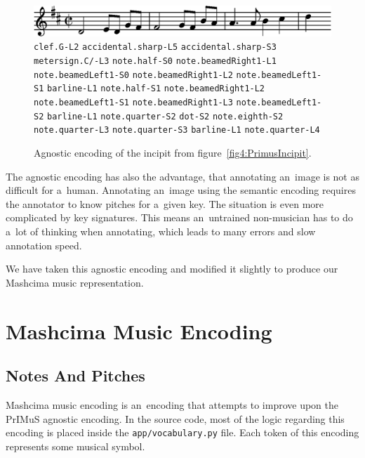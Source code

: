 \begin{figure}[h]
    \centering
    \includegraphics[width=140mm]{../img/primus-incipit}
    \verb`clef.G-L2`
    \quad\verb`accidental.sharp-L5`
    \quad\verb`accidental.sharp-S3`
    \quad\verb`metersign.C/-L3`
    \quad\verb`note.half-S0`
    \quad\verb`note.beamedRight1-L1`
    \quad\verb`note.beamedLeft1-S0`
    \quad\verb`note.beamedRight1-L2`
    \quad\verb`note.beamedLeft1-S1`
    \quad\verb`barline-L1`
    \quad\verb`note.half-S1`
    \quad\verb`note.beamedRight1-L2`
    \quad\verb`note.beamedLeft1-S1`
    \quad\verb`note.beamedRight1-L3`
    \quad\verb`note.beamedLeft1-S2`
    \quad\verb`barline-L1`
    \quad\verb`note.quarter-S2`
    \quad\verb`dot-S2`
    \quad\verb`note.eighth-S2`
    \quad\verb`note.quarter-L3`
    \quad\verb`note.quarter-S3`
    \quad\verb`barline-L1`
    \quad\verb`note.quarter-L4`
    \caption{Agnostic encoding of the incipit from figure~\ref{fig4:PrimusIncipit}.}
    \label{fig4:PrimusIncipitAgnosticEncoded}
\end{figure}

The agnostic encoding has also the advantage, that annotating an~image is not as difficult for a~human. Annotating an~image using the semantic encoding requires the annotator to know pitches for a~given key. The situation is even more complicated by key signatures. This means an~untrained non-musician has to do a~lot of thinking when annotating, which leads to many errors and slow annotation speed.

We have taken this agnostic encoding and modified it slightly to produce our Mashcima music representation.


\section{Mashcima Music Encoding}


\subsection{Notes And Pitches}

Mashcima music encoding is an~encoding that attempts to improve upon the PrIMuS agnostic encoding. In the source code, most of the logic regarding this encoding is placed inside the \texttt{app/vocabulary.py} file. Each token of this encoding represents some musical symbol.

